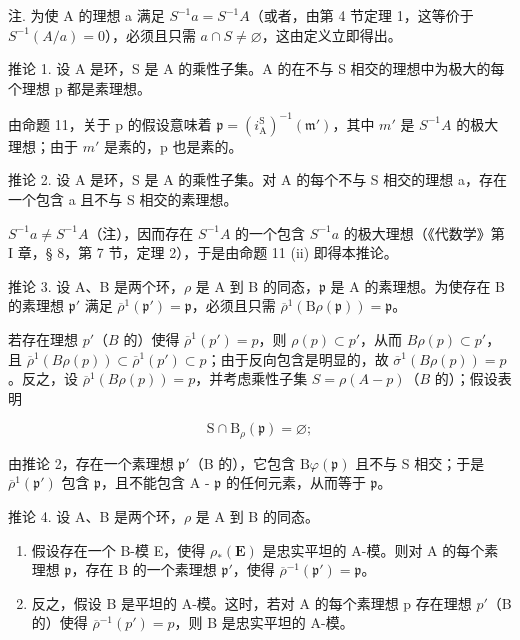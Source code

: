 注. 为使 A 的理想 a 满足 \(S^{-1}a = S^{-1}A\)（或者，由第 4 节定理 1，这等价于 \(S^{-1}(A/a) = 0\)），必须且只需 \(a \cap S \neq \varnothing\)，这由定义立即得出。

推论 1. 设 A 是环，S 是 A 的乘性子集。A 的在不与 S 相交的理想中为极大的每个理想 p 都是素理想。

由命题 11，关于 p 的假设意味着 \(\mathfrak{p} = (i_{\mathrm{A}}^{\mathrm{S}})^{-1}(\mathfrak{m}')\)，其中 \(m'\) 是 \(S^{-1}A\) 的极大理想；由于 \(m'\) 是素的，p 也是素的。

推论 2. 设 A 是环，S 是 A 的乘性子集。对 A 的每个不与 S 相交的理想 a，存在一个包含 a 且不与 S 相交的素理想。

\(S^{-1}a \neq S^{-1}A\)（注），因而存在 \(S^{-1}A\) 的一个包含 \(S^{-1}a\) 的极大理想（《代数学》第 I 章，§ 8，第 7 节，定理 2），于是由命题 11 (ii) 即得本推论。

推论 3. 设 A、B 是两个环，\(\rho\) 是 A 到 B 的同态，\(\mathfrak{p}\) 是 A 的素理想。为使存在 B 的素理想 \(\mathfrak{p}'\) 满足 \(\overline{\rho}^{1}(\mathfrak{p}') = \mathfrak{p}\)，必须且只需 \(\overline{\rho}^{1}(\mathrm{B}\rho(\mathfrak{p})) = \mathfrak{p}\)。

若存在理想 \(p'\)（\(B\) 的）使得 \(\overline{\rho}^{1}(p') = p\)，则 \(\rho(p) \subset p'\)，从而 \(B\rho(p) \subset p'\)，且 \(\overline{\rho}^{1}(B\rho(p)) \subset \overline{\rho}^{1}(p') \subset p\)；由于反向包含是明显的，故 \(\overline{\sigma}^{1}(B\rho(p)) = p\)。反之，设 \(\overline{\rho}^{1}(B\rho(p)) = p\)，并考虑乘性子集 \(S = \rho(A - p)\)（\(B\) 的）；假设表明

\[
\mathrm{S} \cap \mathrm{B} _ {\rho} (\mathfrak {p}) = \varnothing ;
\]

由推论 2，存在一个素理想 \(\mathfrak{p}'\)（B 的），它包含 \(\mathrm{B}\varphi(\mathfrak{p})\) 且不与 S 相交；于是 \(\overline{\rho}^{1}(\mathfrak{p}')\) 包含 \(\mathfrak{p}\)，且不能包含 A - \(\mathfrak{p}\) 的任何元素，从而等于 \(\mathfrak{p}\)。

推论 4. 设 A、B 是两个环，\(\rho\) 是 A 到 B 的同态。

\begin{enumerate}
\def\labelenumi{(\roman{enumi})}
\item
  假设存在一个 B-模 E，使得 \(\rho_{*}(\mathbf{E})\) 是忠实平坦的 A-模。则对 A 的每个素理想 \(\mathfrak{p}\)，存在 B 的一个素理想 \(\mathfrak{p}'\)，使得 \(\overline{\rho}^{-1}(\mathfrak{p}') = \mathfrak{p}\)。
\item
  反之，假设 B 是平坦的 A-模。这时，若对 A 的每个素理想 p 存在理想 \(p'\)（B 的）使得 \(\overline{\rho}^{-1}(p') = p\)，则 B 是忠实平坦的 A-模。
\end{enumerate}

